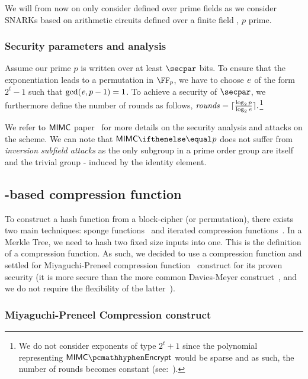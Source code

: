 We will from now on only consider \mimc{} defined over prime fields as we consider SNARKs based on arithmetic circuits defined over a finite field , $p$ prime.

\subsubsection{Security parameters and analysis}\label{instantiation:mkhash:mimc-encryption:security}

Assume our prime $p$ is written over at least $\secpar$ bits. To ensure that the exponentiation leads to a permutation in $\FFx{p}$, we have to choose $\mathit{e}{}$ of the form $2^t-1$ such that $\gcd(\mathit{e}{}, p-1) = 1$. To achieve a security of $\secpar$, we furthermore define the number of rounds as follows, $\mathit{rounds} = \lceil \frac{\log_2 p}{\log_2 \mathit{e}{}} \rceil. $\footnote{We do not consider exponents of type $2^t+1$ since the polynomial representing $\mimcEnc$ would be sparse and as such, the number of rounds becomes constant (see:~\cite[Section 5.3]{albrecht2016mimc}).}

We refer to $\mathsf{MIMC{}}$ paper~\cite[Section 4.2 and 5.1]{albrecht2016mimc} for more details on the security analysis and attacks on the scheme. We can note that $\mimcPrime{p}$ does not suffer from \emph{inversion subfield attacks} as the only subgroup in a prime order group are itself and the trivial group - induced by the identity element.

\subsection{\mimc{}-based compression function}\label{instantiation:mkhash:mimc-compressionf}

To construct a hash function from a block-cipher (or permutation), there exists two main techniques: sponge functions~\cite{bertoni2007sponge} and iterated compression functions~\cite{black2002black}.
In a Merkle Tree, we need to hash two fixed size inputs into one. This is the definition of a compression function. As such, we decided to use a compression function and settled for Miyaguchi-Preneel compression function~\cite[$f_3$ function]{black2002black} construct for its proven security (it is more secure than the more common Davies-Meyer construct~\cite[$f_5$ function]{black2002black}, and we do not require the flexibility of the latter~\cite[Section 3]{gazzoni2006maelstrom}).

\subsubsection{Miyaguchi-Preneel Compression construct}


